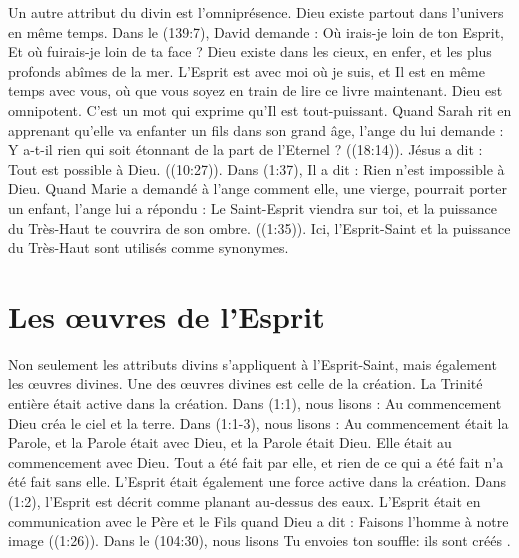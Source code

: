 Un autre attribut du divin est l'omniprésence. Dieu existe partout dans l'univers en même temps. Dans le (139:7), David demande : \og Où irais-je loin de ton Esprit, Et où fuirais-je loin de ta face ? \fg{} Dieu existe dans les cieux, en enfer, et les plus profonds abîmes de la mer. L'Esprit est avec moi où je suis, et Il est en même temps avec vous, où que vous soyez en train de lire ce livre maintenant. Dieu est omnipotent. C'est un mot qui exprime qu'Il est tout-puissant. Quand Sarah rit en apprenant qu'elle va enfanter un fils dans son grand âge, l'ange du \Seigneur{} lui demande : \og Y a-t-il rien qui soit étonnant de la part de l'Eternel ? \fg{} ((18:14)). Jésus a dit : \og Tout est possible à Dieu. \fg{} ((10:27)). Dans (1:37), Il a dit : \og Rien n'est impossible à Dieu. \fg{} Quand Marie a demandé à l'ange comment elle, une vierge, pourrait porter un enfant, l'ange lui a répondu : \og Le Saint-Esprit viendra sur toi, et la puissance du Très-Haut te couvrira de son ombre. \fg{} ((1:35)). Ici, l'Esprit-Saint et la puissance du Très-Haut sont utilisés comme synonymes.

\section{Les œuvres de l'Esprit}


Non seulement les attributs divins s'appliquent à l'Esprit-Saint, mais également les œuvres divines. Une des œuvres divines est celle de la création. La Trinité entière était active dans la création. Dans (1:1), nous lisons : \og Au commencement Dieu créa le ciel et la terre. \fg{} Dans (1:1-3), nous lisons : \og Au commencement était la Parole, et la Parole était avec Dieu, et la Parole était Dieu. Elle était au commencement avec Dieu. Tout a été fait par elle, et rien de ce qui a été fait n'a été fait sans elle. \fg{} L'Esprit était également une force active dans la création. Dans (1:2), l'Esprit est décrit comme planant au-dessus des eaux. L'Esprit était en communication avec le Père et le Fils quand Dieu a dit : \og Faisons l'homme à notre image \fg{} ((1:26)). Dans le (104:30), nous lisons \og Tu envoies ton souffle: ils sont créés \fg{} .

